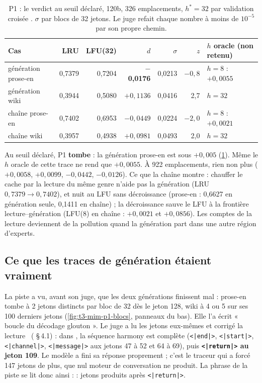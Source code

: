 \begin{table}[tbp]
\centering\small
\caption[P1 : le verdict au seuil déclaré]{P1 : le verdict au seuil déclaré, 120b, 326 emplacements, $h^\ast = 32$ par validation croisée \mes. $\sigma$ par blocs de 32 jetons. Le juge refait chaque nombre à moins de $10^{-5}$ par son propre chemin.}
\label{t3mim:tab:p1}
\begin{tabular}{@{}lrrrrrl@{}}
\toprule
Cas & LRU & LFU(32) & $d$ & $\sigma$ & $z$ & $h$ oracle (non retenu) \\
\midrule
génération prose-en & 0,7379 & 0,7204 & \textbf{$-$0,0176} & 0,0213 & $-0{,}8$ & $h = 8$ : $+0{,}0055$ \\
génération wiki & 0,3944 & 0,5080 & $+0{,}1136$ & 0,0416 & 2,7 & $h = 32$ \\
chaîne prose-en & 0,7402 & 0,6953 & $-0{,}0449$ & 0,0224 & $-2{,}0$ & $h = 8$ : $+0{,}0021$ \\
chaîne wiki & 0,3957 & 0,4938 & $+0{,}0981$ & 0,0493 & 2,0 & $h = 32$ \\
\bottomrule
\end{tabular}
\end{table}

Au seuil déclaré, P1 \textbf{tombe} : la génération prose-en est sous $+0{,}005$ (\cref{t3mim:tab:p1}). Même le $h$ oracle de cette trace ne rend que $+0{,}0055$. À 922 emplacements, rien non plus ($+0{,}0058$, $+0{,}0099$, $-0{,}0442$, $-0{,}0126$). Ce que la chaîne montre : chauffer le cache par la lecture du même genre n'aide pas la génération (LRU $0{,}7379 \to 0{,}7402$), et nuit au LFU sans décroissance (prose-en : 0,6627 en génération seule, 0,1411 en chaîne) ; la décroissance sauve le LFU à la frontière lecture--génération (LFU(8) en chaîne : $+0{,}0021$ et $+0{,}0856$). Les comptes de la lecture deviennent de la pollution quand la génération part dans une autre région d'experts.

\subsection{Ce que les traces de génération étaient vraiment}\label{t3mim:sec:p1-traces}

La piste a vu, avant son juge, que les deux générations finissent mal : prose-en tombe à 2 jetons distincts par bloc de 32 dès le jeton 128, wiki à 4 ou 5 sur ses 100 derniers jetons (\cref{fig:t3-mim-p1-blocs}, panneaux du bas). Elle l'a écrit « boucle du décodage glouton ». Le juge a lu les jetons eux-mêmes et corrigé la lecture \mes~( §\,4.1) : dans , la séquence harmony est complète (\texttt{<|end|>}, \texttt{<|start|>}, \texttt{<|channel|>}, \texttt{<|message|>} aux jetons 47 à 52 et 64 à 69), puis \textbf{\texttt{<|return|>} au jeton 109}. Le modèle a fini sa réponse proprement ; c'est le traceur qui a forcé 147 jetons de plus, que nul moteur de conversation ne produit. La phrase de la piste se lit donc ainsi :  : jetons produits après \texttt{<|return|>}.

